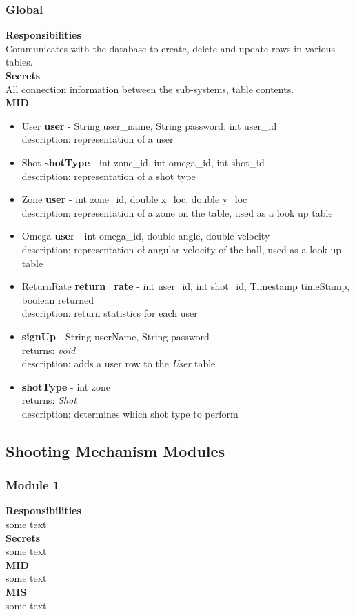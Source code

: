 \documentclass[11pt]{article}
\begin{document}
\subsubsection*{Global}
\textbf{Responsibilities} \\
Communicates with the database to create, delete and update rows in various tables.  \\
\textbf{Secrets} \\ 
All connection information between the sub-systems, table contents.\\ 
\textbf{MID} \\
\begin{itemize}
\item User \textbf{user} - String user_name, String password, int user_id \\ description: representation of a user 
\item Shot \textbf{shotType} - int zone_id, int omega_id, int shot_id \\ description: representation of a shot type
\item Zone \textbf{user} -  int zone_id, double x_loc, double y_loc \\ description: representation of a zone on the table, used as a look up table 
\item Omega \textbf{user} - int omega_id, double angle, double velocity \\ description: representation of angular velocity of the ball, used as a look up table 
\item ReturnRate \textbf{return_rate} - int user_id, int shot_id,  Timestamp timeStamp, boolean returned \\ description: return statistics for each user

\item \textbf{signUp} - String userName, String password \\ returns: \textit{void} \\ description: adds a user row to the \textit{User} table
\item \textbf{shotType} - int zone \\ returns: \textit{Shot} \\ description: determines which shot type to perform

\end{itemize}
\subsection{Shooting Mechanism Modules}
\subsubsection*{Module 1}
\textbf{Responsibilities} \\
some text \\
\textbf{Secrets} \\ 
some text \\ 
\textbf{MID} \\
some text \\
\textbf{MIS} \\
some text \\
\end{document}
